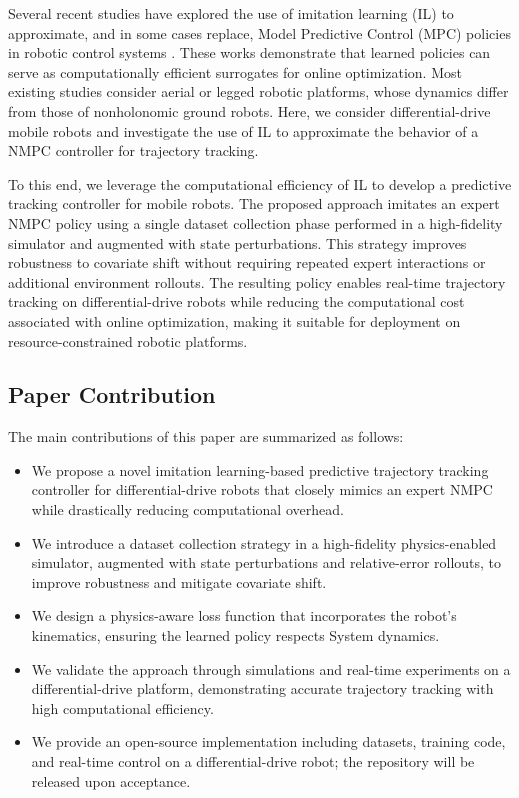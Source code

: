 \documentclass[letterpaper, 10 pt, conference]{ieeeconf}
\begin{document}
Several recent studies have explored the use of imitation learning (IL) to approximate, and in some cases replace, Model Predictive Control (MPC) policies in robotic control systems \cite{IL_MPC_1,IL_MPC_2,IL_MPC_3,IL_MPC_4}. These works demonstrate that learned policies can serve as computationally efficient surrogates for online optimization. Most existing studies consider aerial or legged robotic platforms, whose dynamics differ from those of nonholonomic ground robots. Here, we consider differential-drive mobile robots and investigate the use of IL to approximate the behavior of a NMPC controller for trajectory tracking.

To this end, we leverage the computational efficiency of IL to develop a predictive tracking controller for mobile robots. The proposed approach imitates an expert NMPC policy using a single dataset collection phase performed in a high-fidelity simulator and augmented with state perturbations. This strategy improves robustness to covariate shift without requiring repeated expert interactions or additional environment rollouts. The resulting policy enables real-time trajectory tracking on differential-drive robots while reducing the computational cost associated with online optimization, making it suitable for deployment on resource-constrained robotic platforms.
%
%
\subsection{Paper Contribution}
The main contributions of this paper are summarized as follows:

\begin{itemize}
  \item We propose a novel imitation learning-based predictive trajectory tracking controller for differential-drive robots that closely mimics an expert NMPC while drastically reducing computational overhead.
  \item We introduce a dataset collection strategy in a high-fidelity physics-enabled simulator, augmented with state perturbations and relative-error rollouts, to improve robustness and mitigate covariate shift.
  \item We design a physics-aware loss function that incorporates the robot’s kinematics, ensuring the learned policy respects System dynamics.
  \item We validate the approach through simulations and real-time experiments on a differential-drive platform, demonstrating accurate trajectory tracking with high computational efficiency.
  \item We provide an open-source implementation including datasets, training code, and real-time control on a differential-drive robot; the repository will be released upon acceptance.
\end{itemize}
\end{document}
